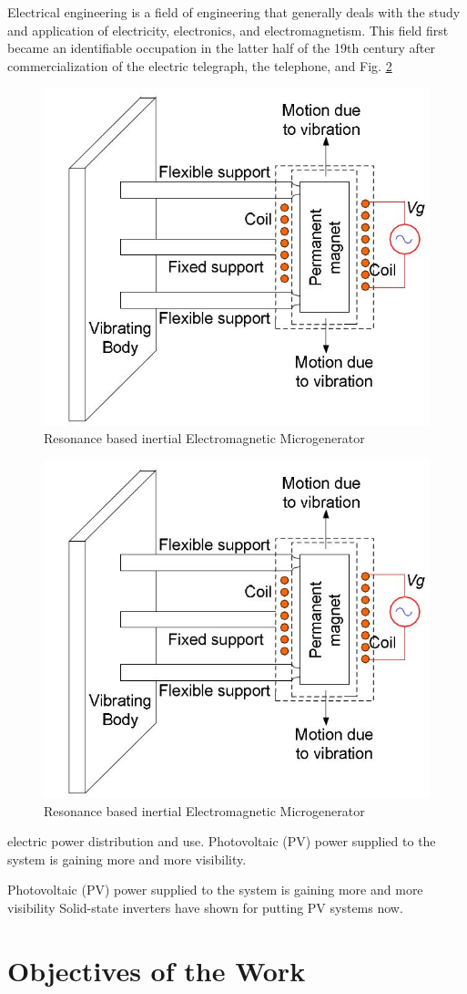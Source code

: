 Electrical engineering is a field of engineering that generally deals with the study and application of electricity, electronics, and electromagnetism. This field first became an identifiable occupation in the latter half of the 19th century after commercialization of the electric telegraph, the telephone, and Fig. \ref{a}
\begin{figure}[h]
	\begin{center}
		\includegraphics[width =5 cm]{1.jpg}
		\caption{Resonance based inertial Electromagnetic Microgenerator}
		\label{ab}
	\end{center}
\end{figure}

\begin{figure}[h]
\begin{center}
\includegraphics[width =5 cm]{1.jpg}
\caption{Resonance based inertial Electromagnetic Microgenerator}
\label{a}
\end{center}
\end{figure}

electric power distribution and use.\cite{ref1} Photovoltaic (PV) power supplied to the system is gaining more and more visibility. \cite{ref3}

Photovoltaic (PV) power supplied to the system is gaining more and more visibility Solid-state inverters have shown for putting PV systems now. \cite{ref2}



 \section{Objectives of the Work}     %

